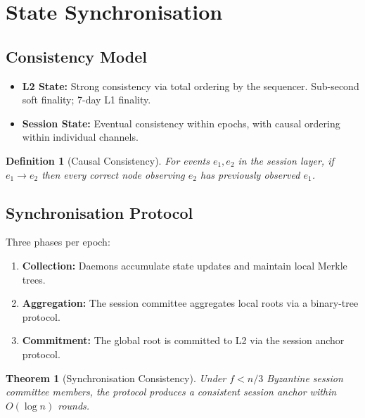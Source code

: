 \documentclass[11pt,a4paper]{article}
\newtheorem{definition}{Definition}[section]
\newtheorem{theorem}{Theorem}[section]
\begin{document}
\section{State Synchronisation}
\label{sec:statesync}

\subsection{Consistency Model}

\begin{itemize}
    \item \textbf{L2 State:} Strong consistency via total ordering by the
    sequencer.  Sub-second soft finality; 7-day L1 finality.

    \item \textbf{Session State:} Eventual consistency within epochs, with
    causal ordering within individual channels.
\end{itemize}

\begin{definition}[Causal Consistency]
    For events $e_1, e_2$ in the session layer, if $e_1 \to e_2$ then
    every correct node observing $e_2$ has previously observed $e_1$.
\end{definition}

\subsection{Synchronisation Protocol}

Three phases per epoch:

\begin{enumerate}
    \item \textbf{Collection:} Daemons accumulate state updates and
    maintain local Merkle trees.
    \item \textbf{Aggregation:} The session committee aggregates local
    roots via a binary-tree protocol.
    \item \textbf{Commitment:} The global root is committed to L2 via
    the session anchor protocol.
\end{enumerate}

\begin{theorem}[Synchronisation Consistency]
    Under $f < n/3$ Byzantine session committee members, the protocol
    produces a consistent session anchor within $O(\log n)$ rounds.
\end{theorem}
\end{document}
